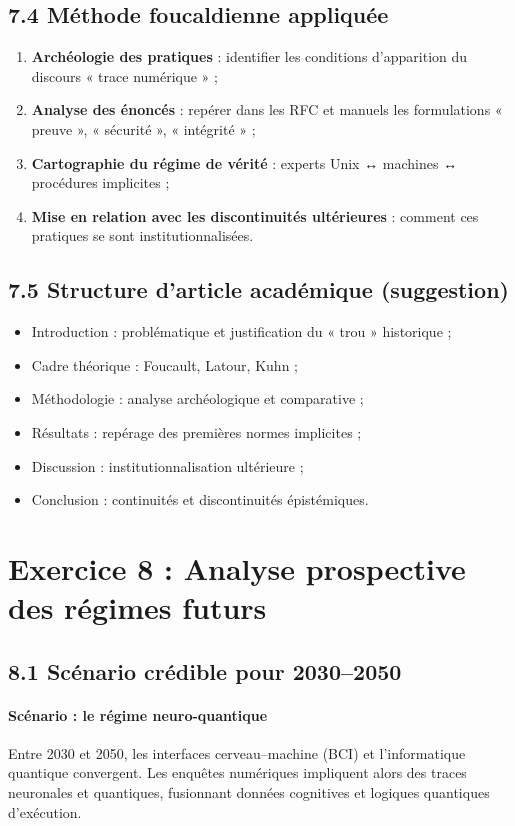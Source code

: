 \documentclass[12pt,a4paper]{article}
\begin{document}
\subsection{7.4 Méthode foucaldienne appliquée}
\begin{enumerate}
  \item \textbf{Archéologie des pratiques} : identifier les conditions d’apparition du discours « trace numérique » ;
  \item \textbf{Analyse des énoncés} : repérer dans les RFC et manuels les formulations « preuve », « sécurité », « intégrité » ;
  \item \textbf{Cartographie du régime de vérité} : experts Unix ↔ machines ↔ procédures implicites ;
  \item \textbf{Mise en relation avec les discontinuités ultérieures} : comment ces pratiques se sont institutionnalisées.
\end{enumerate}

\subsection{7.5 Structure d’article académique (suggestion)}
\begin{itemize}
  \item Introduction : problématique et justification du « trou » historique ;
  \item Cadre théorique : Foucault, Latour, Kuhn ;
  \item Méthodologie : analyse archéologique et comparative ;
  \item Résultats : repérage des premières normes implicites ;
  \item Discussion : institutionnalisation ultérieure ;
  \item Conclusion : continuités et discontinuités épistémiques.
\end{itemize}

\clearpage
\section{Exercice 8 : Analyse prospective des régimes futurs}
\subsection{8.1 Scénario crédible pour 2030–2050}
\paragraph{Scénario : le régime neuro-quantique}
Entre 2030 et 2050, les interfaces cerveau–machine (BCI) et l’informatique quantique convergent.  
Les enquêtes numériques impliquent alors des traces neuronales et quantiques, fusionnant données cognitives et logiques quantiques d’exécution.
\end{document}
